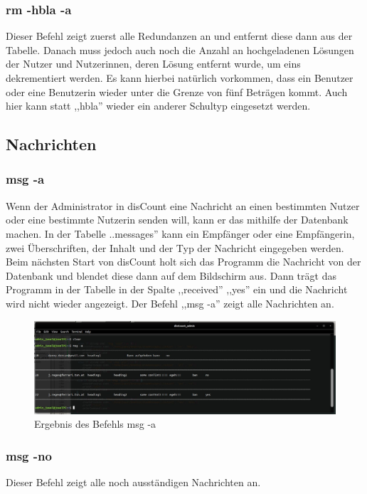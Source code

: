 \documentclass[12pt]{report}
\begin{document}
\subsubsection{rm -hbla -a}
Dieser Befehl zeigt zuerst alle Redundanzen an und entfernt diese dann aus der Tabelle. Danach muss jedoch auch noch die Anzahl an hochgeladenen Lösungen der Nutzer und Nutzerinnen, deren Lösung entfernt wurde, um eins dekrementiert werden. Es kann hierbei natürlich vorkommen, dass ein Benutzer oder eine Benutzerin wieder unter die Grenze von fünf Beträgen kommt. Auch hier kann statt ,,hbla'' wieder ein anderer Schultyp eingesetzt werden.

\subsection{Nachrichten}

\subsubsection{msg -a}
Wenn der Administrator in disCount eine Nachricht an einen bestimmten Nutzer oder eine bestimmte Nutzerin senden will, kann er das mithilfe der Datenbank machen. In der Tabelle ..messages'' kann ein Empfänger oder eine Empfängerin, zwei Überschriften, der Inhalt und der Typ der Nachricht eingegeben werden. Beim nächsten Start von disCount holt sich das Programm die Nachricht von der Datenbank und blendet diese dann auf dem Bildschirm aus. Dann trägt das Programm in der Tabelle in der Spalte ,,received'' ,,yes'' ein und die Nachricht wird nicht wieder angezeigt. Der Befehl ,,msg -a'' zeigt alle Nachrichten an.

\begin{figure}[h]
	\centering
	\includegraphics[width=15cm]{images/msg_a}
	\caption[Befehl msg -a]{Ergebnis des Befehls msg -a}
\end{figure}
  
  

\subsubsection{msg -no}
Dieser Befehl zeigt alle noch ausständigen Nachrichten an.
\end{document}
